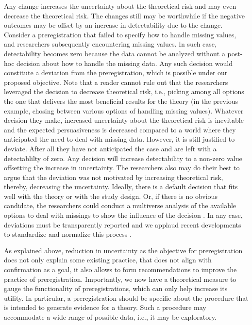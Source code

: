 \documentclass[jou,a4paper]{apa7}
\begin{document}
Any change increases the uncertainty about the theoretical risk and may even decrease the theoretical risk.
The changes still may be worthwhile if the negative outcomes may be offset by an increase in detectability due to the change.
Consider a preregistration that failed to specify how to handle missing values, and researchers subsequently encountering missing values.
In such case, detectability becomes zero because the data cannot be analyzed without a post-hoc decision about how to handle the missing data.
Any such decision would constitute a deviation from the preregistration, which is possible under our proposed objective.
Note that a reader cannot rule out that the researchers leveraged the decision to decrease theoretical risk, i.e., picking among all options the one that delivers the most beneficial results for the theory (in the previous example, chosing between various options of handling missing values).
Whatever decision they make, increased uncertainty about the theoretical risk is inevitable and the expected persuasiveness is decreased compared to a world where they anticipated the need to deal with missing data.
However, it is still justified to deviate.
After all they have not anticipated the case and are left with a detectablilty of zero.
Any decision will increase detectability to a non-zero value offsetting the increase in uncertainty.
The researchers also may do their best to argue that the deviation was not motivated by increasing theoretical risk, thereby, decreasing the uncertainty.
Ideally, there is a default decision that fits well with the theory or with the study design.
Or, if there is no obvious candidate, the researchers could conduct a multiverse analysis of the available options to deal with missings to show the influence of the decision \parencite{steegenIncreasingTransparencyMultiverse2016}.
In any case, deviations must be transparently reported and we applaud recent developments to standardize and normalize this process \parencite{willrothBestLaidPlans2023}.\par
As explained above, reduction in uncertainty as the objective for preregistration does not only explain some existing practice, that does not align with confirmation as a goal, it also allows to form recommendations to improve the practice of preregistration.
Importantly, we now have a theoretical measure to gauge the functionality of preregistrations, which can only help increase its utility.
In particular, a preregistration should be specific about the procedure that is intended to generate evidence for a theory.
Such a procedure may accommodate a wide range of possible data, i.e., it may be exploratory.
\end{document}
